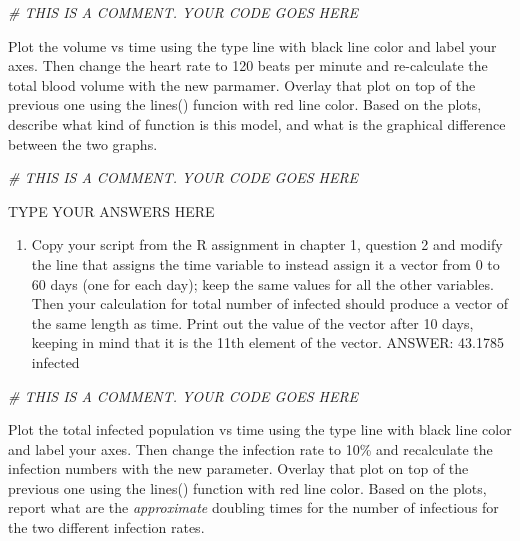 \documentclass[
]{book}
\newenvironment{Shaded}{\begin{snugshade}}{\end{snugshade}}
\newcommand{\CommentTok}[1]{\textcolor[rgb]{0.56,0.35,0.01}{\textit{#1}}}
\providecommand{\tightlist}{%
  \setlength{\itemsep}{0pt}\setlength{\parskip}{0pt}}
\theoremstyle{definition}
\theoremstyle{definition}
\theoremstyle{definition}
\theoremstyle{remark}
\begin{document}
\begin{Shaded}
\begin{Highlighting}[]
\CommentTok{\# THIS IS A COMMENT. YOUR CODE GOES HERE }
\end{Highlighting}
\end{Shaded}

Plot the volume vs time using the type line with black line color and label your axes. Then change the heart rate to 120 beats per minute and re-calculate the total blood volume with the new parmamer. Overlay that plot on top of the previous one using the lines() funcion with red line color. Based on the plots, describe what kind of function is this model, and what is the graphical difference between the two graphs.

\begin{Shaded}
\begin{Highlighting}[]
\CommentTok{\# THIS IS A COMMENT. YOUR CODE GOES HERE }
\end{Highlighting}
\end{Shaded}

TYPE YOUR ANSWERS HERE

\begin{enumerate}
\def\labelenumi{\arabic{enumi}.}
\setcounter{enumi}{1}
\tightlist
\item
  Copy your script from the R assignment in chapter 1, question 2 and modify the line that assigns the time variable to instead assign it a vector from 0 to 60 days (one for each day); keep the same values for all the other variables. Then your calculation for total number of infected should produce a vector of the same length as time. Print out the value of the vector after 10 days, keeping in mind that it is the 11th element of the vector. ANSWER: 43.1785 infected
\end{enumerate}

\begin{Shaded}
\begin{Highlighting}[]
\CommentTok{\# THIS IS A COMMENT. YOUR CODE GOES HERE }
\end{Highlighting}
\end{Shaded}

Plot the total infected population vs time using the type line with black line color and label your axes. Then change the infection rate to 10\% and recalculate the infection numbers with the new parameter. Overlay that plot on top of the previous one using the lines() function with red line color. Based on the plots, report what are the \emph{approximate} doubling times for the number of infectious for the two different infection rates.
\end{document}
